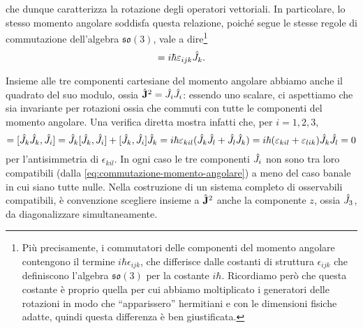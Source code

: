 che dunque caratterizza la rotazione degli operatori vettoriali.
In particolare, lo stesso momento angolare soddisfa questa relazione, poich\'e segue le stesse regole di commutazione dell'algebra $\mathfrak{so}(3)$, vale a dire\footnote{
	Più precisamente, i commutatori delle componenti del momento angolare contengono il termine $i\hbar\epsilon_{ijk}$, che differisce dalle costanti di struttura $\epsilon_{ijk}$ che definiscono l'algebra $\mathfrak{so}(3)$ per la costante $i\hbar$.
	Ricordiamo però che questa costante è proprio quella per cui abbiamo moltiplicato i generatori delle rotazioni in modo che ``apparissero'' hermitiani e con le dimensioni fisiche adatte, quindi questa differenza è ben giustificata.
}
\begin{equation}
	[\op J_i,\op J_j]=i\hbar\epsilon_{ijk}\op J_k.
	\label{eq:commutazione-momento-angolare}
\end{equation}

Insieme alle tre componenti cartesiane del momento angolare abbiamo anche il quadrato del suo modulo, ossia $\hat{\mathbf{J}}^2=\hat{J}_i\hat{J}_i$: essendo uno scalare, ci aspettiamo che sia invariante per rotazioni ossia che commuti con tutte le componenti del momento angolare.
Una verifica diretta mostra infatti che, per $i=1,2,3$,
\begin{equation}
	[\op{\vec J}^2,\op J_i]=[\op J_k\op J_k,\op J_i]=\op J_k[\op J_k,\op J_i]+[\op J_k,\op J_i]\op J_k=i\hbar\epsilon_{kil}(\op J_k\op J_l+\op J_l\op J_k)=i\hbar(\epsilon_{kil}+\epsilon_{lik})\op J_k\op J_l=0
\end{equation}
per l'antisimmetria di $\epsilon_{kil}$.
In ogni caso le tre componenti $\hat{J}_i$ non sono tra loro compatibili (dalla \eqref{eq:commutazione-momento-angolare}) a meno del caso banale in cui siano tutte nulle.
Nella costruzione di un sistema completo di osservabili compatibili, è convenzione scegliere insieme a $\hat{\mathbf{J}}^2$ anche la componente $z$, ossia $\hat{J}_3$, da diagonalizzare simultaneamente.

